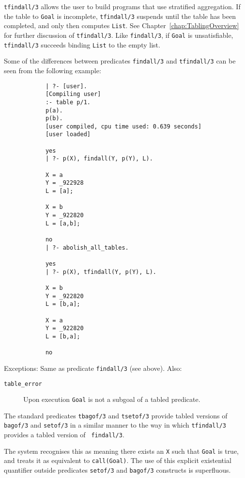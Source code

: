 \begin{description}
    {\tt tfindall/3} allows the user to build programs that use
    stratified aggregation.  If the table to {\tt Goal} is incomplete,
    {\tt tfindall/3} suspends until the table has been completed, and
    only then computes {\tt List}.  See Chapter~\ref{chap:TablingOverview}
    for further discussion of {\tt tfindall/3}.  Like {\tt findall/3},
    if {\tt Goal} is unsatisfiable, {\tt tfindall/3} succeeds binding
    {\tt List} to the empty list.

    Some of the differences between predicates {\tt findall/3} and
    {\tt tfindall/3} can be seen from the following example:

    {\footnotesize
    \begin{verbatim}
            | ?- [user].
            [Compiling user]
            :- table p/1.
            p(a).
            p(b).
            [user compiled, cpu time used: 0.639 seconds]
            [user loaded]

            yes
            | ?- p(X), findall(Y, p(Y), L).

            X = a
            Y = _922928
            L = [a];

            X = b
            Y = _922820
            L = [a,b];

            no
            | ?- abolish_all_tables.

            yes
            | ?- p(X), tfindall(Y, p(Y), L).

            X = b
            Y = _922820
            L = [b,a];

            X = a
            Y = _922820
            L = [b,a];

            no
    \end{verbatim}
    }

    Exceptions: Same as predicate {\tt findall/3} (see above).  Also:
    \begin{description}
    \item[{\tt table\_error}]
	Upon execution {\tt Goal} is not a subgoal of a tabled predicate.
    \end{description}


The standard predicates {\tt tbagof/3} and {\tt tsetof/3} provide
tabled versions of {\tt bagof/3} and {\tt setof/3} in a similar manner
to the way in which {\tt tfindall/3} provides a tabled version of {\tt
findall/3}.

    The system recognises this as meaning there exists an {\tt X} such
    that {\tt Goal} is true, and treats it as equivalent to {\tt call(Goal)}.
    The use of this explicit existential quantifier outside predicates
    {\tt setof/3} and {\tt bagof/3} constructs is superfluous.
\end{description}

